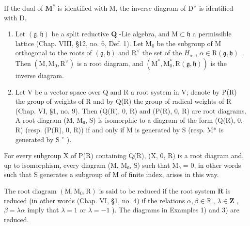 If the dual of \(\mathbf{M}^*\) is identified with M, the inverse diagram of \(\mathrm{D}^{\vee}\) is identified with D.

\begin{enumerate}
\def\labelenumi{\arabic{enumi})}
\setcounter{enumi}{2}
\item
  Let \((\mathfrak{g},\mathfrak{h})\) be a split reductive \(\mathbf{Q}\) -Lie algebra, and \(\mathrm{M} \subset \mathfrak{h}\) a permissible lattice (Chap. VIII, §12, no. 6, Def. 1). Let \(\mathrm{M}_0\) be the subgroup of M orthogonal to the roots of \((\mathfrak{g},\mathfrak{h})\) and \(\mathrm{R}^\vee\) the set of the \(H_{\alpha}\) , \(\alpha \in \mathrm{R}(\mathfrak{g},\mathfrak{h})\) . Then \((\mathrm{M},\mathrm{M}_0,\mathrm{R}^\vee)\) is a root diagram, and \((\mathrm{M}^*,\mathrm{M}_0^*,\mathrm{R}(\mathfrak{g},\mathfrak{h}))\) is the inverse diagram.
\item
  Let V be a vector space over Q and R a root system in V; denote by P(R) the group of weights of R and by Q(R) the group of radical weights of R (Chap. VI, §1, no. 9). Then (Q(R), 0, R) and (P(R), 0, R) are root diagrams. A root diagram (M, M₀, S) is isomorphic to a diagram of the form (Q(R), 0, R) (resp. (P(R), 0, R)) if and only if M is generated by S (resp. M* is generated by S \(^{v}\) ).
\end{enumerate}

For every subgroup X of P(R) containing Q(R), (X, 0, R) is a root diagram and, up to isomorphism, every diagram (M, M₀, S) such that M₀ = 0, in other words such that S generates a subgroup of M of finite index, arises in this way.

The root diagram \((\mathrm{M},\mathrm{M}_0,\mathrm{R})\) is said to be reduced if the root system \(\mathbf{R}\) is reduced (in other words (Chap. VI, §1, no. 4) if the relations \(\alpha ,\beta \in \mathbb{R}\) , \(\lambda \in \mathbf{Z}\) , \(\beta = \lambda \alpha\) imply that \(\lambda = 1\) or \(\lambda = -1\) ). The diagrams in Examples 1) and 3) are reduced.

